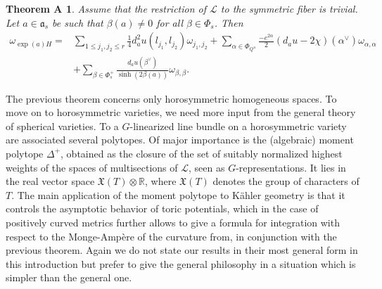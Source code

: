 \documentclass{amsart}
\newtheorem*{thma}{Theorem A}
\theoremstyle{definition}
\begin{document}
\begin{thma}
Assume that the restriction of $\mathcal{L}$ to the symmetric 
fiber is trivial. Let $a\in \mathfrak{a}_s$ be such that $\beta(a)\neq 0$ for all 
$\beta \in \Phi_s$. Then 
\begin{align*} 
\omega_{\exp(a)H} = & \sum_{1\leq j_1,j_2\leq r} 
\frac{1}{4}d^2_au(l_{j_1},l_{j_2}) 
\omega_{j_1,j_2}  
+ \sum_{\alpha\in \Phi_{Q^u}} 
\frac{-e^{2\alpha}}{2}(d_au-2\chi)(\alpha^{\vee})
\omega_{\alpha,\alpha} \\
& + \sum_{\beta \in \Phi_s^+} 
\frac{d_au(\beta^{\vee})}{\sinh(2\beta(a))} 
\omega_{\beta,\beta}.
\end{align*}
\end{thma}

The previous theorem concerns only horosymmetric homogeneous spaces. 
To move on to horosymmetric varieties, we need more input from the 
general theory of spherical varieties. To a $G$-linearized line bundle 
on a horosymmetric variety are associated several polytopes. 
Of major importance is the (algebraic) moment polytope $\Delta^+$, obtained as the closure of the 
set of suitably normalized highest weights of the spaces of multisections 
of $\mathcal{L}$, seen as $G$-representations. It lies in the real 
vector space $\mathfrak{X}(T)\otimes \mathbb{R}$, where $\mathfrak{X}(T)$
denotes the group of characters of $T$.
The main application of the moment polytope to Kähler geometry is that it 
controls the asymptotic behavior of toric potentials, which in the case 
of positively curved metrics further allows to give a formula for 
integration with respect to the Monge-Ampère of the curvature from, 
in conjunction with the previous theorem. 
Again we do not state 
our results in their most general form in this introduction but 
prefer to give the general 
philosophy in a situation which is simpler than the general one. 
\end{document}
